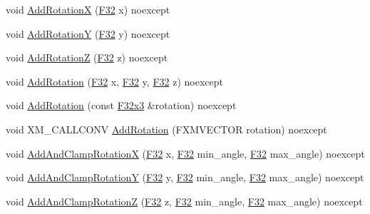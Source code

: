 \begin{DoxyCompactItemize}
\item 
void \hyperlink{classmage_1_1_transform_node_a7428a3f49cb24a9f2eadb94d77e7b87f}{Add\+RotationX} (\hyperlink{namespacemage_aa97e833b45f06d60a0a9c4fc22ae02c0}{F32} x) noexcept
\item 
void \hyperlink{classmage_1_1_transform_node_a609c4d2cfb34f43f365851ab7092fbe1}{Add\+RotationY} (\hyperlink{namespacemage_aa97e833b45f06d60a0a9c4fc22ae02c0}{F32} y) noexcept
\item 
void \hyperlink{classmage_1_1_transform_node_acb9abe975906ff1df858933de4d7cdbc}{Add\+RotationZ} (\hyperlink{namespacemage_aa97e833b45f06d60a0a9c4fc22ae02c0}{F32} z) noexcept
\item 
void \hyperlink{classmage_1_1_transform_node_a38853632e217f1538ee8d232eaa24205}{Add\+Rotation} (\hyperlink{namespacemage_aa97e833b45f06d60a0a9c4fc22ae02c0}{F32} x, \hyperlink{namespacemage_aa97e833b45f06d60a0a9c4fc22ae02c0}{F32} y, \hyperlink{namespacemage_aa97e833b45f06d60a0a9c4fc22ae02c0}{F32} z) noexcept
\item 
void \hyperlink{classmage_1_1_transform_node_ad00c4b17873b0fdb9a7c30bd185c1cb2}{Add\+Rotation} (const \hyperlink{namespacemage_a73fbe0da4b8d5bc156bb8453e5b63a17}{F32x3} \&rotation) noexcept
\item 
void X\+M\+\_\+\+C\+A\+L\+L\+C\+O\+NV \hyperlink{classmage_1_1_transform_node_af0bc80ccd27d20204e73496cdb68e14b}{Add\+Rotation} (F\+X\+M\+V\+E\+C\+T\+OR rotation) noexcept
\item 
void \hyperlink{classmage_1_1_transform_node_a5ae080b77bdbfba4f90d6b102d902044}{Add\+And\+Clamp\+RotationX} (\hyperlink{namespacemage_aa97e833b45f06d60a0a9c4fc22ae02c0}{F32} x, \hyperlink{namespacemage_aa97e833b45f06d60a0a9c4fc22ae02c0}{F32} min\+\_\+angle, \hyperlink{namespacemage_aa97e833b45f06d60a0a9c4fc22ae02c0}{F32} max\+\_\+angle) noexcept
\item 
void \hyperlink{classmage_1_1_transform_node_a713addf2de315ca49e81da378cdc7fa6}{Add\+And\+Clamp\+RotationY} (\hyperlink{namespacemage_aa97e833b45f06d60a0a9c4fc22ae02c0}{F32} y, \hyperlink{namespacemage_aa97e833b45f06d60a0a9c4fc22ae02c0}{F32} min\+\_\+angle, \hyperlink{namespacemage_aa97e833b45f06d60a0a9c4fc22ae02c0}{F32} max\+\_\+angle) noexcept
\item 
void \hyperlink{classmage_1_1_transform_node_a3b11eaf107656551939f824a089a117f}{Add\+And\+Clamp\+RotationZ} (\hyperlink{namespacemage_aa97e833b45f06d60a0a9c4fc22ae02c0}{F32} z, \hyperlink{namespacemage_aa97e833b45f06d60a0a9c4fc22ae02c0}{F32} min\+\_\+angle, \hyperlink{namespacemage_aa97e833b45f06d60a0a9c4fc22ae02c0}{F32} max\+\_\+angle) noexcept

\end{DoxyCompactItemize}
